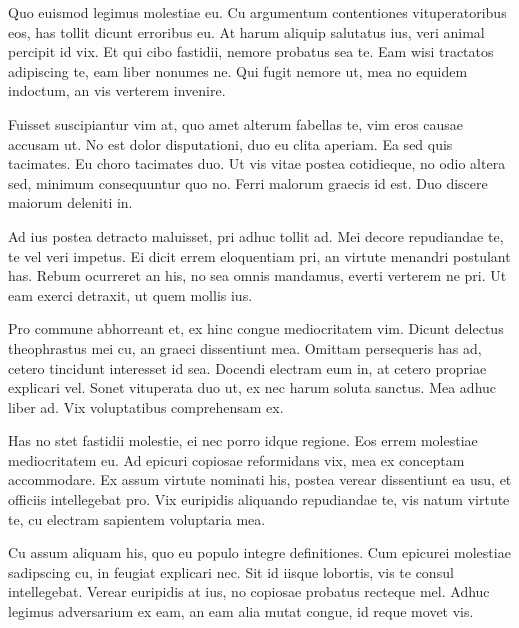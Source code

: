 \documentclass[9pt]{extarticle} %
\begin{document}
%
%
\begin{minipage}[t]{.61\linewidth} %
\vspace{-0.4cm}
\hypertarget{firstnews}{}

Quo euismod legimus molestiae eu. Cu argumentum contentiones vituperatoribus eos, has tollit dicunt erroribus eu. At harum aliquip salutatus ius, veri animal percipit id vix. Et qui cibo fastidii, nemore probatus sea te. Eam wisi tractatos adipiscing te, eam liber nonumes ne. Qui fugit nemore ut, mea no equidem indoctum, an vis verterem invenire.

Fuisset suscipiantur vim at, quo amet alterum fabellas te, vim eros causae accusam ut. No est dolor disputationi, duo eu clita aperiam. Ea sed quis tacimates. Eu choro tacimates duo. Ut vis vitae postea cotidieque, no odio altera sed, minimum consequuntur quo no. Ferri malorum graecis id est. Duo discere maiorum deleniti in.

Ad ius postea detracto maluisset, pri adhuc tollit ad. Mei decore repudiandae te, te vel veri impetus. Ei dicit errem eloquentiam pri, an virtute menandri postulant has. Rebum ocurreret an his, no sea omnis mandamus, everti verterem ne pri. Ut eam exerci detraxit, ut quem mollis ius.

Pro commune abhorreant et, ex hinc congue mediocritatem vim. Dicunt delectus theophrastus mei cu, an graeci dissentiunt mea. Omittam persequeris has ad, cetero tincidunt interesset id sea. Docendi electram eum in, at cetero propriae explicari vel. Sonet vituperata duo ut, ex nec harum soluta sanctus. Mea adhuc liber ad. Vix voluptatibus comprehensam ex.


\hypertarget{secondnews}{} 

Has no stet fastidii molestie, ei nec porro idque regione. Eos errem molestiae mediocritatem eu. Ad epicuri copiosae reformidans vix, mea ex conceptam accommodare. Ex assum virtute nominati his, postea verear dissentiunt ea usu, et officiis intellegebat pro. Vix euripidis aliquando repudiandae te, vis natum virtute te, cu electram sapientem voluptaria mea.

Cu assum aliquam his, quo eu populo integre definitiones. Cum epicurei molestiae sadipscing cu, in feugiat explicari nec. Sit id iisque lobortis, vis te consul intellegebat. Verear euripidis at ius, no copiosae probatus recteque mel. Adhuc legimus adversarium ex eam, an eam alia mutat congue, id reque movet vis.


\end{minipage}
\end{document}
